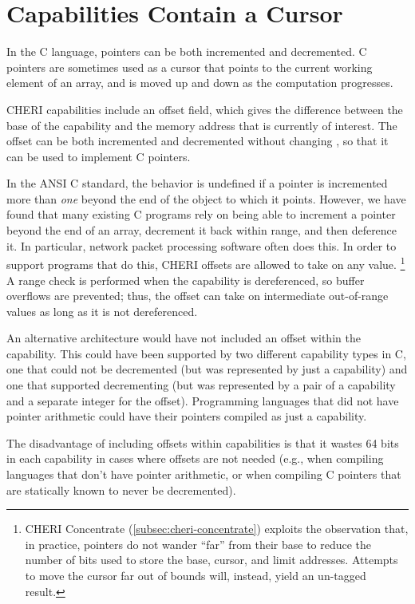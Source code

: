 \section{Capabilities Contain a Cursor}

In the C language, pointers can be both incremented and decremented.
C pointers are sometimes used as a cursor that points to the current working
element of an array, and is moved up and down as the computation progresses.

CHERI capabilities include an offset field, which gives the difference between
the base of the capability and the memory address that is currently of
interest. The offset can be both incremented and decremented without changing
\cbase{}, so that it can be used to implement C pointers.

In the ANSI C standard, the behavior is undefined if a pointer is incremented
more than {\it one} beyond the end of the object to which it points. However, we have found
that many existing C programs rely on being able to increment a pointer beyond
the end of an array, decrement it back within range, and then deference it.
In particular, network packet processing software often does this.
In order to support programs that do this, CHERI offsets are allowed to take
on any value.%
%
\footnote{CHERI Concentrate (\cref{subsec:cheri-concentrate}) exploits the
observation that, in practice, pointers do not wander ``far'' from their base
to reduce the number of bits used to store the base, cursor, and limit
addresses.  Attempts to move the cursor far out of bounds will, instead, yield
an un-tagged result.}
%
A range check is performed when the capability is
dereferenced, so buffer overflows are prevented; thus, the offset can take
on intermediate out-of-range values as long as it is not dereferenced.

An alternative architecture would have not included an offset within the
capability. This could have been supported by two different capability types
in C, one that could not be decremented (but was represented by just a
capability) and one that supported decrementing (but was represented by a pair of
a capability and a separate integer for the offset).  Programming languages
that did not have pointer arithmetic could have their pointers compiled as
just a capability.

The disadvantage of including offsets within capabilities is that it wastes
64 bits in each capability in cases where offsets are not needed (e.g.,
when compiling languages that don't have pointer arithmetic, or when
compiling C pointers that are statically known to never be decremented).

